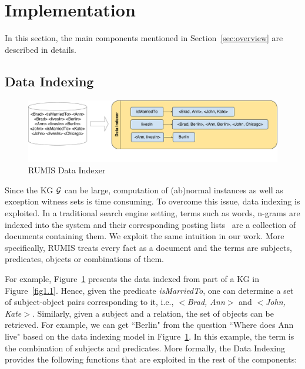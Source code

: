\section{Implementation}

In this section, the main components mentioned in Section~\ref{sec:overview} are described in details.

\subsection{Data Indexing}
\label{data_indexing}

\begin{figure}[h]
\centering
\includegraphics[width=1\textwidth]{figures/data_indexing}
\caption{RUMIS Data Indexer}
\label{data_indexing}
\end{figure}

Since the KG $\mathcal{G}$ can be large, computation of (ab)normal instances as well as exception witness sets is time consuming. To overcome this issue, data indexing is exploited. In a traditional search engine setting, terms such as words, n-grams are indexed into the system and their corresponding posting lists~\cite{ref47} are a collection of documents containing them. We exploit the same intuition in our work. More specifically, RUMIS treats every fact as a document and the terms are subjects, predicates, objects or combinations of them.

For example, Figure~\ref{data_indexing} presents the data indexed from part of a KG in Figure~\ref{fig1.1}. Hence, given the predicate \textit{isMarriedTo}, one can determine a set of subject-object pairs corresponding to it, i.e., \textit{$<$Brad, Ann$>$} and \textit{$<$John, Kate$>$}. Similarly, given a subject and a relation, the set of objects can be retrieved. For example, we can get ``Berlin" from the question ``Where does Ann live" based on the data indexing model in Figure~\ref{data_indexing}. In this example, the term is the combination of subjects and predicates. More formally, the Data Indexing provides the following functions that are exploited in the rest of the components:

